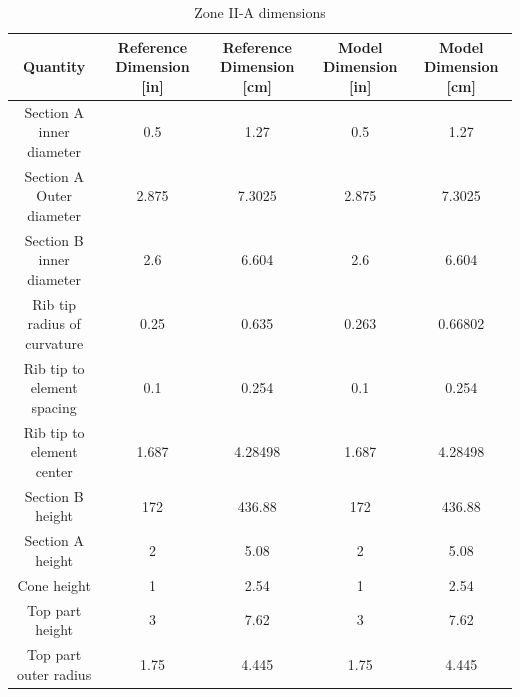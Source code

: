 \begin{table}[htpb]
    \centering
    \caption{Zone II-A dimensions}
    \label{tab:zone-iia-specs}
    \begin{tabulary}{\linewidth}{|C|CC|CC|}
    \hline
    Quantity & Reference Dimension [in] & Reference Dimension [\unit{\centi\metre}] & Model Dimension [in] & Model Dimension [\unit{\centi\metre}]\\
    \hline
    Section A inner diameter & 0.5 & 1.27 & 0.5 & 1.27 \\
    \hline
    Section A Outer diameter & 2.875 & 7.3025 & 2.875 & 7.3025 \\
    \hline
    Section B inner diameter & 2.6 & 6.604 & 2.6 & 6.604 \\
    \hline
    Rib tip radius of curvature & 0.25 & 0.635 & 0.263 & 0.66802\\
    \hline
    Rib tip to element spacing & 0.1 & 0.254 & 0.1 & 0.254\\
    \hline
    Rib tip to element center & 1.687 & 4.28498 & 1.687 & 4.28498\\
    \hline
    Section B height & 172 & 436.88 & 172 & 436.88\\
    \hline
    Section A height & 2 & 5.08 & 2 & 5.08 \\
    \hline
    Cone height & 1 & 2.54 & 1 & 2.54 \\
    \hline
    Top part height & 3 & 7.62 & 3 & 7.62 \\
    \hline
    Top part outer radius & 1.75 & 4.445 & 1.75 & 4.445 \\
    \hline
    \end{tabulary}
\end{table}

